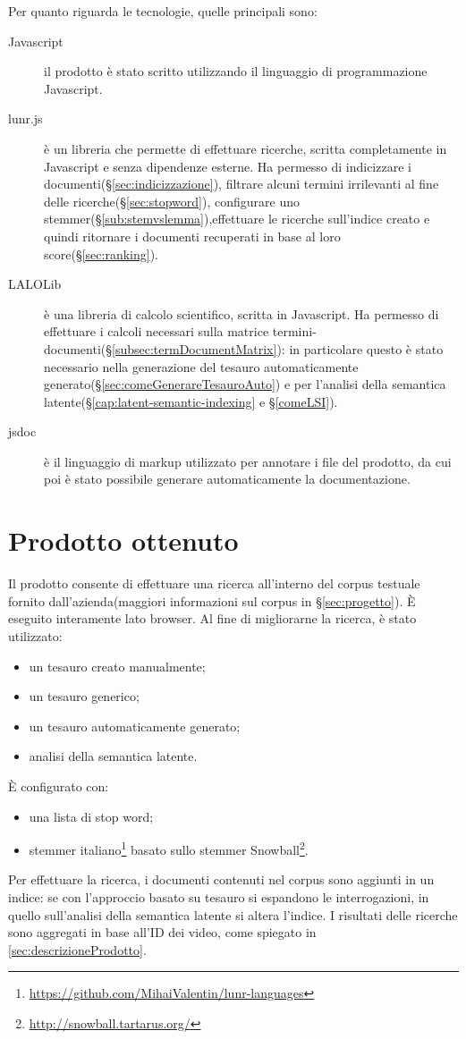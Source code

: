 Per quanto riguarda le tecnologie, quelle principali sono:

\begin{description}
    \item[Javascript] il prodotto è stato scritto utilizzando il linguaggio di programmazione Javascript.
    \item[lunr.js] è un libreria che permette di effettuare ricerche, scritta completamente in
Javascript e senza dipendenze esterne. Ha permesso di indicizzare i documenti(§\ref{sec:indicizzazione}), filtrare alcuni termini irrilevanti al fine delle ricerche(§\ref{sec:stopword}), configurare
uno stemmer(§\ref{sub:stemvslemma}),effettuare le ricerche sull’indice creato e quindi ritornare i documenti recuperati in base al loro score(§\ref{sec:ranking}).
\item[LALOLib] è una libreria di calcolo scientifico, scritta in Javascript. Ha permesso di
effettuare i calcoli necessari sulla matrice termini-documenti(§\ref{subsec:termDocumentMatrix}): in particolare questo è stato necessario nella generazione del tesauro automaticamente
generato(§\ref{sec:comeGenerareTesauroAuto}) e per l’analisi della semantica latente(§\ref{cap:latent-semantic-indexing}
e §\ref{comeLSI}).
\item[\gls{jsdoc}\glsfirstoccur{}] è il linguaggio di markup utilizzato per annotare i file del prodotto, da cui poi
è stato possibile generare automaticamente la documentazione.
\end{description}


\section{Prodotto ottenuto}
Il prodotto consente di effettuare una ricerca all’interno del \gls{corpus} testuale fornito
dall’azienda(maggiori informazioni sul \gls{corpus} in §\ref{sec:progetto}). È eseguito interamente lato
browser. Al fine di migliorarne la ricerca, è stato utilizzato:
\begin{itemize}
    \item un tesauro creato manualmente;
    \item un tesauro generico;
    \item un tesauro automaticamente generato;
    \item analisi della semantica latente.
\end{itemize}
È configurato con:
\begin{itemize}
    \item una lista di stop word;
    \item stemmer italiano\footnote{\url{https://github.com/MihaiValentin/lunr-languages}} basato sullo stemmer Snowball\footnote{\url{http://snowball.tartarus.org/}}.
\end{itemize} 
Per effettuare la ricerca, i documenti contenuti nel \gls{corpus} sono aggiunti in un indice:
se con l’approccio basato su tesauro si espandono le interrogazioni, in quello sull’analisi
della semantica latente si altera l’indice. I risultati delle ricerche sono aggregati in base
all’ID dei video, come spiegato in \ref{sec:descrizioneProdotto}.

